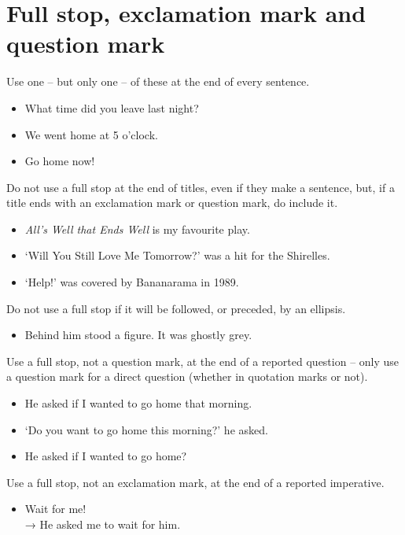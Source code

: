 \documentclass[11pt,a4paper]{book}
\newcommand{\xmark}{{\color{cadmiumred}\ding{54}}}%
\newcommand{\cmark}{{\color{green(html/cssgreen)}\checkmark}}%
\begin{document}
	\section{Full stop, exclamation mark and question mark}
	Use one -- but only one -- of these at the end of every sentence.
		{\firasans \begin{mdframed}[backgroundcolor=aliceblue] \begin{itemize}[label=\cmark]
			\item What time did you leave last night?
			\item We went home at 5 o'clock.
			\item Go home now!
		\end{itemize} \end{mdframed} }
	Do not use a full stop at the end of titles, even if they make a sentence, but, if a title ends with an exclamation mark or question mark, do include it.
	{\firasans \begin{mdframed}[backgroundcolor=aliceblue] \begin{itemize}[label=\cmark]
		\item \textit{All's Well that Ends Well} is my favourite play.
		\item `Will You Still Love Me Tomorrow?' was a hit for the Shirelles.
		\item `Help!' was covered by Bananarama in 1989.
	\end{itemize} \end{mdframed} }
	Do not use a full stop if it will be followed, or preceded, by an ellipsis.
	{\firasans \begin{mdframed}[backgroundcolor=aliceblue] \begin{itemize}[label=\cmark]
		\item[\xmark] Behind him stood a figure. \textellipsis It was ghostly grey.
	\end{itemize} \end{mdframed} }
	Use a full stop, not a question mark, at the end of a reported question -- only use a question mark for a direct question (whether in quotation marks or not).
	{\firasans \begin{mdframed}[backgroundcolor=aliceblue] \begin{itemize}[label=\cmark]
		\item He asked if I wanted to go home that morning.
		\item `Do you want to go home this morning?' he asked.
		\item[\xmark] He asked if I wanted to go home?
	\end{itemize} \end{mdframed} }
	\newpage
	Use a full stop, not an exclamation mark, at the end of a reported imperative.
	{\firasans \begin{mdframed}[backgroundcolor=aliceblue] \begin{itemize}[label=\cmark]
		\item Wait for me!\\ → He asked me to wait for him.
	\end{itemize} \end{mdframed} }
\end{document}
